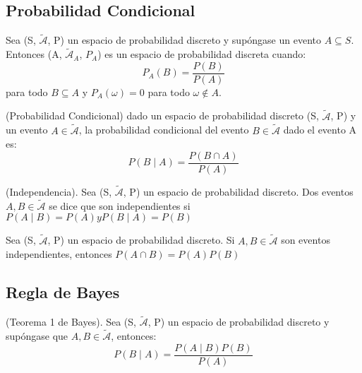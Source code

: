 \subsection{Probabilidad Condicional}

\begin{lem} Sea (S, $\mathcal{\tilde{A}}$, P) un espacio de probabilidad discreto y supóngase un evento $A\subseteq S$. Entonces (A, $\mathcal{\tilde{A}}_{A}$, $P_{A}$) es un espacio de probabilidad discreta cuando:\begin{equation}\label{EspA} P_{A}(B)= \dfrac{P(B)}{P(A)}
	\end{equation}
para todo $B\subseteq A$ y $P_{A}(\omega)=0$ para todo $\omega\notin A$.

\end{lem}

\begin{defn}(Probabilidad Condicional) dado un espacio de probabilidad discreto (S, $\mathcal{\tilde{A}}$, P) y un evento $A\in\mathcal{\tilde{A}}$, la probabilidad condicional del evento  $B\in\mathcal{\tilde{A}}$ dado el evento A es:\begin{equation}\label{pcond}
	P(B\mid A)= \dfrac{P(B\cap A)}{P(A)}
	\end{equation}
\end{defn}

\begin{defn}(Independencia). Sea (S, $\mathcal{\tilde{A}}$, P) un espacio de probabilidad discreto. Dos eventos $A,B\in \mathcal{\tilde{A}}$ se dice que son independientes si $P(A\mid B)=P(A) y P(B\mid A)=P(B)$
\end{defn}

\begin{thm} Sea (S, $\mathcal{\tilde{A}}$, P) un espacio de probabilidad discreto. Si $A, B\in \mathcal{\tilde{A}}$ son eventos independientes, entonces $P(A\cap B)=P(A)P(B)$	
\end{thm}

\subsection{Regla de Bayes}

\begin{lem}(Teorema 1 de Bayes). Sea (S, $\mathcal{\tilde{A}}$, P) un espacio de probabilidad discreto y supóngase que $A, B\in\mathcal{\tilde{A}}$, entonces:\begin{equation}\label{bayes1} P(B\mid A)=\dfrac{P(A\mid B)P(B)}{P(A)}	
	\end{equation}
\end{lem}

